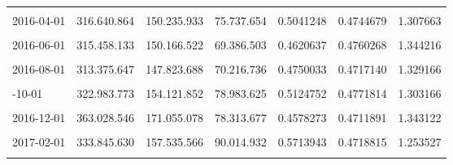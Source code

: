 \documentclass[12pt]{article}
\begin{document}
\begin{longtable}[t]{llllrrr}
\cellcolor{gray!10}{2016-03-01} & \cellcolor{gray!10}{313.677.641} & \cellcolor{gray!10}{148.210.093} & \cellcolor{gray!10}{77.062.381} & \cellcolor{gray!10}{0.5199537} & \cellcolor{gray!10}{0.4724917} & \cellcolor{gray!10}{1.293356}\\
2016-04-01 & 316.640.864 & 150.235.933 & 75.737.654 & 0.5041248 & 0.4744679 & 1.307663\\
\addlinespace
\cellcolor{gray!10}{2016-05-01} & \cellcolor{gray!10}{314.364.643} & \cellcolor{gray!10}{149.595.843} & \cellcolor{gray!10}{75.196.819} & \cellcolor{gray!10}{0.5026665} & \cellcolor{gray!10}{0.4758673} & \cellcolor{gray!10}{1.310040}\\
2016-06-01 & 315.458.133 & 150.166.522 & 69.386.503 & 0.4620637 & 0.4760268 & 1.344216\\
\cellcolor{gray!10}{2016-07-01} & \cellcolor{gray!10}{313.978.056} & \cellcolor{gray!10}{147.268.307} & \cellcolor{gray!10}{74.135.585} & \cellcolor{gray!10}{0.5034049} & \cellcolor{gray!10}{0.4690401} & \cellcolor{gray!10}{1.303650}\\
2016-08-01 & 313.375.647 & 147.823.688 & 70.216.736 & 0.4750033 & 0.4717140 & 1.329166\\
\cellcolor{gray!10}{2016-09-01} & \cellcolor{gray!10}{323.287.076} & \cellcolor{gray!10}{151.306.402} & \cellcolor{gray!10}{75.055.280} & \cellcolor{gray!10}{0.4960483} & \cellcolor{gray!10}{0.4680249} & \cellcolor{gray!10}{1.308664}\\
\addlinespace
2016-10-01 & 322.983.773 & 154.121.852 & 78.983.625 & 0.5124752 & 0.4771814 & 1.303166\\
\cellcolor{gray!10}{2016-11-01} & \cellcolor{gray!10}{332.706.192} & \cellcolor{gray!10}{158.865.851} & \cellcolor{gray!10}{71.079.643} & \cellcolor{gray!10}{0.4474193} & \cellcolor{gray!10}{0.4774959} & \cellcolor{gray!10}{1.358428}\\
2016-12-01 & 363.028.546 & 171.055.078 & 78.313.677 & 0.4578273 & 0.4711891 & 1.343122\\
\cellcolor{gray!10}{2017-01-01} & \cellcolor{gray!10}{326.435.805} & \cellcolor{gray!10}{151.990.251} & \cellcolor{gray!10}{87.946.650} & \cellcolor{gray!10}{0.5786335} & \cellcolor{gray!10}{0.4656053} & \cellcolor{gray!10}{1.244076}\\
2017-02-01 & 333.845.630 & 157.535.566 & 90.014.932 & 0.5713943 & 0.4718815 & 1.253527\\
\addlinespace
\cellcolor{gray!10}{2017-03-01} & \cellcolor{gray!10}{325.270.676} & \cellcolor{gray!10}{152.547.049} & \cellcolor{gray!10}{70.886.723} & \cellcolor{gray!10}{0.4646876} & \cellcolor{gray!10}{0.4689849} & \cellcolor{gray!10}{1.335209}\\

\end{longtable}
\end{document}
